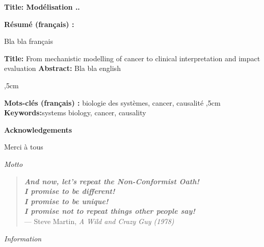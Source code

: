 \newpage
\thispagestyle{empty}
\noindent %

\textbf{Title: Modélisation ..}

\vskip 1cm
\textbf{Résumé (français) :}

Bla bla français

\vskip 1cm
\noindent
\textbf{Title: }
From mechanistic modelling of cancer to clinical interpretation and impact evaluation\vskip 1cm
\noindent
\textbf{Abstract:}
Bla bla english

,5cm
\noindent

\textbf{Mots-clés (français) :} biologie des systèmes, cancer, causalité
,5cm
\noindent
\textbf{Keywords:}systems biology, cancer, causality



\newpage
\thispagestyle{empty}
\begin{center}
\large{\textbf{Acknowledgements}}
\end{center}
\vspace{2cm}

Merci à tous

\newpage
\emph{Motto}
\vspace*{\fill}

\begin{quote}
\emph{\textbf{And now, let's repeat the Non-Conformist Oath!\\
I promise to be different!\\
I promise to be unique!\\
I promise not to repeat things other people say!}}\\
— Steve Martin, \textit{A Wild and Crazy Guy (1978)}\\
\end{quote}

\vspace*{\fill}
 
\newpage
\emph{Information}
\vspace*{\fill}

\large{}

\vspace*{\fill}

\newpage